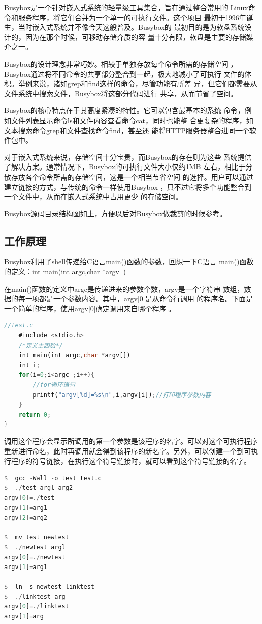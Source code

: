 Busybox是一个针对嵌入式系统的轻量级工具集合，旨在通过整合常用的
Linux命令和服务程序，将它们合并为一个单一的可执行文件。这个项目
最初于1996年诞生，当时嵌入式系统并不像今天这般普及。Busybox的
最初目的是为软盘系统设计的，因为在那个时候，可移动存储介质的容
量十分有限，软盘是主要的存储媒介之一。

Busybox的设计理念非常巧妙。相较于单独存放每个命令所需的存储空间
，Busybox通过将不同命令的共享部分整合到一起，极大地减小了可执行
文件的体积。举例来说，诸如grep和find这样的命令，尽管功能有所差
异，但它们都需要从文件系统中搜索文件，Busybox将这部分代码进行
共享，从而节省了空间。

Busybox的核心特点在于其高度紧凑的特性。它可以包含最基本的系统
命令，例如文件列表显示命令ls和文件内容查看命令cat，同时也能整
合更复杂的程序，如文本搜索命令grep和文件查找命令find，甚至还
能将HTTP服务器整合进同一个软件包中。

对于嵌入式系统来说，存储空间十分宝贵，而Busybox的存在则为这些
系统提供了解决方案。通常情况下，Busybox的可执行文件大小仅约1MB
左右，相比于分散存放各个命令所需的存储空间，这是一个相当节省空间
的选择。用户可以通过建立链接的方式，与传统的命令一样使用Busybox
，只不过它将多个功能整合到一个文件中，从而在嵌入式系统中占用更少
的存储空间。

Busybox源码目录结构图如上，方便以后对Busybox做裁剪的时候参考。

\subsection{工作原理}
Busybox利用了shell传递给C语言main()函数的参数，回想一下C语言
main()函数的定义：int main(int argc,char *argv[])

在main()函数的定义中argc是传递进来的参数个数，argv是一个字符串
数组，数据的每一项都是一个参数内容。其中，argv[0]是从命令行调用
的程序名。下面是一个简单的程序，使用argv[0]确定调用来自哪个程序
。

\begin{lstlisting}[language=Rust]
	//test.c
	#include <stdio.h>
	/*定义主函数*/
	int main(int argc,char *argv[])
	int i;
	for(i=0;i<argc ;i++){
		//for循环语句
		printf("argv[%d]=%s\n",i,argv[i]);//打印程序参数内容
	}
	return 0;
}
\end{lstlisting}

调用这个程序会显示所调用的第一个参数是该程序的名字。可以对这个可执行程序重新进行命名，此时再调用就会得到该程序的新名字。另外，可以创建一个到可执行程序的符号链接，在执行这个符号链接时，就可以看到这个符号链接的名字。

\begin{lstlisting}[language=Rust]
$  gcc -Wall -o test test.c
$  ./test argl arg2
argv[0]=./test
argv[1]=arg1
argv[2]=arg2

$  mv test newtest
$  ./newtest argl
argv[0]=./newtest
argv[1]=arg1

$  ln -s newtest linktest
$  ./linktest arg
argv[0]=./linktest
argv[1]=arg
\end{lstlisting}

